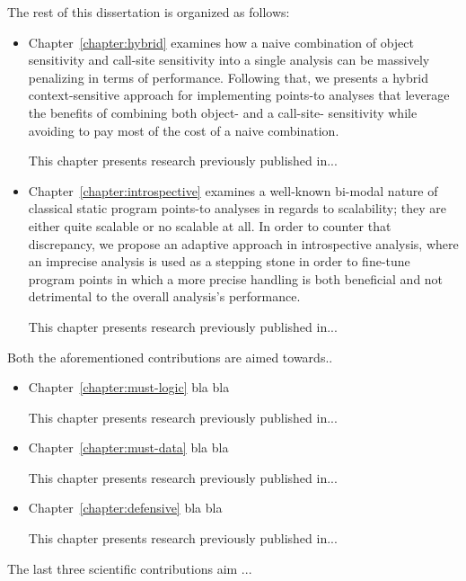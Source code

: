 The rest of this dissertation is organized as follows:
\begin{itemize}[$\bullet$]
\item Chapter~\ref{chapter:hybrid} examines how a naive combination of object sensitivity and call-site sensitivity into a single analysis can be massively penalizing in terms of performance. Following that, we presents a hybrid context-sensitive approach for implementing points-to analyses that leverage the benefits of combining both object- and a call-site- sensitivity while avoiding to pay most of the cost of a naive combination.

This chapter presents research previously published in... %

\item Chapter~\ref{chapter:introspective} examines a well-known bi-modal nature of classical static program points-to analyses in regards to scalability; they are either quite scalable or no scalable at all. In order to counter that discrepancy, we propose an adaptive approach in introspective analysis, where an imprecise analysis is used as a stepping stone in order to fine-tune program points in which a more precise handling is both beneficial and not detrimental to the overall analysis's performance.

This chapter presents research previously published in...
\end{itemize}

Both the aforementioned contributions are aimed towards..

\begin{itemize}[$\bullet$]
\item Chapter~\ref{chapter:must-logic} bla bla

This chapter presents research previously published in...

\item Chapter~\ref{chapter:must-data} bla bla

This chapter presents research previously published in...

\item Chapter~\ref{chapter:defensive} bla bla

This chapter presents research previously published in...
\end{itemize}

The last three scientific contributions aim ...

